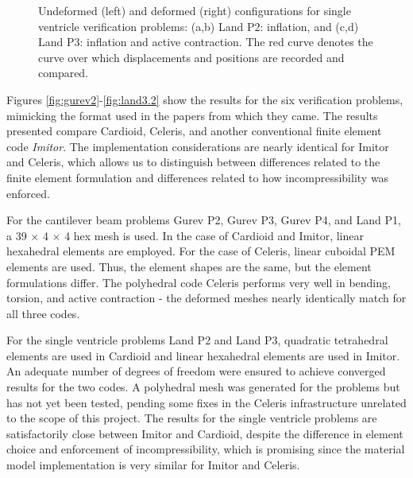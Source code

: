 \begin{figure}[ht]
{\label{fig:ventricles3}}		
\hfill
{}		
%
\caption{Undeformed (left) and deformed (right) configurations for single ventricle verification problems: (a,b) Land P2: inflation, and (c,d) Land P3: inflation and active contraction. The red curve denotes the curve over which displacements and positions are recorded and compared.}
\label{fig:ventricles}
\end{figure}

Figures \ref*{fig:gurev2}-\ref*{fig:land3.2} show the results for the six verification problems, mimicking the format used in the papers from which they came. The results presented compare Cardioid, Celeris, and another conventional finite element code \textit{Imitor}. The implementation considerations are nearly identical for Imitor and Celeris, which allows us to distinguish between differences related to the finite element formulation and differences related to how incompressibility was enforced.

For the cantilever beam problems Gurev P2, Gurev P3, Gurev P4, and Land P1, a 39 $\times$ 4 $\times$ 4 hex mesh is used. In the case of Cardioid and Imitor, linear hexahedral elements are employed. For the case of Celeris, linear cuboidal PEM elements are used. Thus, the element shapes are the same, but the element formulations differ. The polyhedral code Celeris performs very well in bending, torsion, and active contraction - the deformed meshes nearly identically match for all three codes.

For the single ventricle problems Land P2 and Land P3, quadratic tetrahedral elements are used in Cardioid and linear hexahedral elements are used in Imitor. An adequate number of degrees of freedom were ensured to achieve converged results for the two codes. A polyhedral mesh was generated for the problems but has not yet been tested, pending some fixes in the Celeris infrastructure unrelated to the scope of this project. The results for the single ventricle problems are satisfactorily close between Imitor and Cardioid, despite the difference in element choice and enforcement of incompressibility, which is promising since the material model implementation is very similar for Imitor and Celeris.

